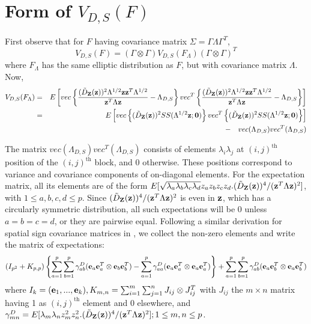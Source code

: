 \documentclass[fleqn,11pt]{article}
\begin{document}
\section{\textbf{Form of $V_{D,S}(F)$}}\label{section:appA}

First observe that for $F$ having covariance matrix $\Sigma = \Gamma\Lambda\Gamma^T$,
%
$$ V_{D,S}(F)  = (\Gamma \otimes \Gamma) V_{D,S}(F_\Lambda) (\Gamma \otimes \Gamma)^T$$
%
where $F_\Lambda$ has the same elliptic distribution as $F$, but with covariance matrix $\Lambda$. Now,
%
\begin{eqnarray*}
V_{D,S} (F_\Lambda) &=& E \left[ vec \left\{ \frac{(\tilde D_{\mathbf{Z}} ({\bf{z}}))^2 \Lambda^{1/2} {\bf{z}}{\bf{z}}^T \Lambda^{1/2}}{{\bf{z}}^T\Lambda{\bf{z}}} - \Lambda_{D,S} \right\} vec^T \left\{ \frac{(\tilde D_{\mathbf{Z}} ({\bf{z}}))^2 \Lambda^{1/2} {\bf{z}}{\bf{z}}^T \Lambda^{1/2}}{{\bf{z}}^T\Lambda{\bf{z}}} - \Lambda_{D,S} \right\} \right]\\
&=& E \left[ vec \left\{ (\tilde D_{\mathbf{Z}} ({\bf{z}}))^2 SS(\Lambda^{1/2}{\bf{z}}; \bf0) \right\} vec^T \left\{ (\tilde D_{\mathbf{Z}} ({\bf{z}}))^2 SS(\Lambda^{1/2}{\bf{z}}; \bf0) \right\} \right]\\
&& - \quad vec(\Lambda_{D,S}) vec^T(\Lambda_{D,S})
\end{eqnarray*}

The matrix $vec(\Lambda_{D,S}) vec^T(\Lambda_{D,S})$ consists of elements $\lambda_i\lambda_j$ at $(i,j)^\text{th}$ position of the $(i,j)^\text{th}$ block, and 0 otherwise. These positions correspond to variance and covariance components of on-diagonal elements. For the expectation matrix, all its elements are of the form $E[\sqrt{\lambda_a \lambda_b \lambda_c \lambda_d} z_a z_b z_c z_d . (\tilde D_{\mathbf{Z}} ({\bf{z}}))^4 / ({\bf{z}}^T \Lambda {\bf{z}})^2]$, with $1 \leq a,b,c,d \leq p$. Since $(\tilde D_{\mathbf{Z}} ({\bf{z}}))^4 / ({\bf{z}}^T \Lambda {\bf{z}})^2$ is even in ${\bf{z}}$, which has a circularly symmetric distribution, all such expectations will be 0 unless $a=b=c=d$, or they are pairwise equal. Following a similar derivation for spatial sign covariance matrices in \cite{magyar14}, we collect the non-zero elements and write the matrix of expectations:
%
$$ (I_{p^2} + K_{p,p}) \left\{ \sum_{a=1}^p \sum_{b=1}^p \gamma^D_{ab} ({\bf{e}}_a {\bf{e}}_a^T \otimes  {\bf{e}}_b {\bf{e}}_b^T) - \sum_{a=1}^p \gamma^D_{aa} ({\bf{e}}_a {\bf{e}}_a^T \otimes  {\bf{e}}_a {\bf{e}}_a^T) \right\} + \sum_{a=1}^p \sum_{b=1}^p \gamma^D_{ab} ({\bf{e}}_a {\bf{e}}_b^T \otimes  {\bf{e}}_a {\bf{e}}_b^T) $$
%
where $I_k = ({\bf{e}}_1,...,{\bf{e}}_k), K_{m,n} = \sum_{i=1}^m \sum_{j=1}^n J_{ij} \otimes J_{ij}^T$ with $J_{ij}$ the $m \times n$ matrix having 1 as $(i,j)^\text{th}$ element and 0 elsewhere, and $\gamma^D_{mn} = E[ \lambda_m \lambda_n z_m^2 z_n ^2 . (\tilde D_{\mathbf{Z}} ({\bf{z}}))^4 / ({\bf{z}}^T \Lambda {\bf{z}})^2]; 1 \leq m,n \leq p$.
\end{document}
